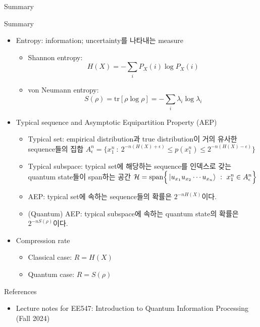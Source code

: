 \documentclass[9pt]{beamer}
\begin{document}
    \begin{frame}{Summary}
        \begin{block}{Summary}
            \begin{itemize}
                \item Entropy: information; uncertainty를 나타내는 measure 
                \begin{itemize}
                    \item Shannon entropy: 
                    \begin{equation*}
                        H(X) = - \sum_i P_X(i) \log P_X(i)
                    \end{equation*}
                    \item von Neumann entropy: 
                    \begin{equation*}
                        S(\rho) = \text{tr} [\rho \log \rho] = -\sum_i \lambda_i \log \lambda_i
                    \end{equation*}
                \end{itemize}
                \item Typical sequence and Asymptotic Equipartition Property (AEP)
                \begin{itemize}
                    \item Typical set: empirical distribution과 true distribution이 거의 유사한 sequence들의 집합 
                        $A_{\epsilon}^n = \Big\{x_1^n \ : \  2^{-n(H(X) + \epsilon)} \le p(x_1^n) \le 2^{-n (H(X) - \epsilon)}\Big\}$
                    \item Typical subspace: typical set에 해당하는 sequence를 인덱스로 갖는 quantum state들이 span하는 공간 $
                        \mathcal H = \text{span} \Big\{ \ket{u_{x_1}u_{x_2} \cdots u_{x_n}} \ : \ x_1^n \in A_\epsilon^n \Big\}$
                    \item AEP: typical set에 속하는 sequence들의 확률은 $2^{-nH(X)}$이다.
                    \item (Quantum) AEP: typical subspace에 속하는 quantum state의 확률은 $2^{-nS(\rho)}$이다.
                \end{itemize}
            \item Compression rate
            \begin{itemize}
                \item Classical case: $R = H(X)$
                \item Quantum case: $R = S(\rho)$
            \end{itemize}
            \end{itemize}
        \end{block}
    \end{frame}


    \begin{frame}{References}
        \begin{itemize}
            \item Lecture notes for EE547: Introduction to Quantum Information Processing (Fall 2024)
        \end{itemize}
        \vspace{6cm}
    \end{frame}
\end{document}
